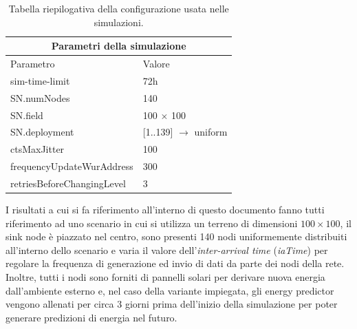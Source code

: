 \documentclass{report}
\begin{document}
\begin{table}[hb]
    \centering
    \begin{tabular}{ |p{5cm}|p{3cm}|  }
        \hline
        \multicolumn{2}{|c|}{Parametri della simulazione}           \\
        \hline
        Parametro                  & Valore                         \\
        \hline
        sim-time-limit             & 72h                            \\
        SN.numNodes                & 140                            \\
        SN.field                   & 100 $\times$ 100               \\
        SN.deployment              & [1..139] $\rightarrow$ uniform \\
        ctsMaxJitter               & 100                            \\
        frequencyUpdateWurAddress  & 300                            \\
        retriesBeforeChangingLevel & 3                              \\
        \hline
    \end{tabular}
    \caption{Tabella riepilogativa della configurazione usata nelle simulazioni.}
\end{table}

I risultati a cui si fa riferimento all'interno di questo documento fanno tutti riferimento ad uno scenario in cui si utilizza un terreno di dimensioni
$100 \times 100$, il sink node è piazzato nel centro, sono presenti 140 nodi uniformemente distribuiti all'interno dello scenario e varia il valore
dell'\emph{inter-arrival time} (\emph{iaTime}) per regolare la frequenza di generazione ed invio di dati da parte dei nodi della rete. Inoltre, tutti
i nodi sono forniti di pannelli solari per derivare nuova energia dall'ambiente esterno e, nel caso della variante impiegata, gli energy predictor
vengono allenati per circa 3 giorni prima dell'inizio della simulazione per poter generare predizioni di energia nel futuro.\\
\end{document}
